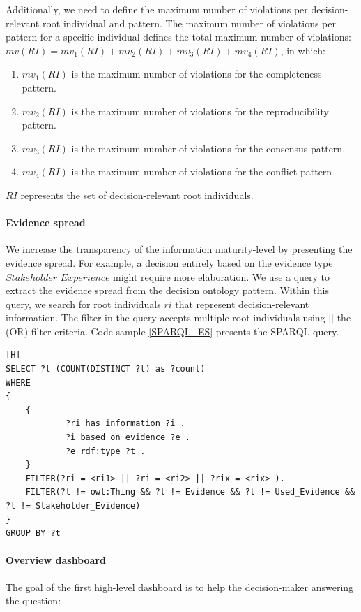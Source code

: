 Additionally, we need to define the maximum number of violations per decision-relevant root individual and pattern. The maximum number of violations per pattern for a specific individual defines the total maximum number of violations: $mv(RI) = mv_1(RI) + mv_2(RI) + mv_3(RI) + mv_4(RI)$, in which:
\begin{enumerate}
\item $mv_1(RI)$ is the maximum number of violations for the completeness pattern.
\item $mv_2(RI)$ is the maximum number of violations for the reproducibility pattern.
\item $mv_3(RI)$ is the maximum number of violations for the consensus pattern.
\item $mv_4(RI)$ is the maximum number of violations for the conflict pattern
\end{enumerate}

$RI$ represents the set of decision-relevant root individuals.

\paragraph{Evidence spread}
We increase the transparency of the information maturity-level by presenting the evidence spread. For example, a decision entirely based on the evidence type $Stakeholder\_Experience$ might require more elaboration. We use a query to extract the evidence spread from the decision ontology pattern. Within this query, we search for root individuals $ri$ that represent decision-relevant information. The filter in the query accepts multiple root individuals using $||$ the (OR) filter criteria. Code sample \ref{SPARQL_ES} presents the SPARQL query. 

\begin{lstlisting}[float,language=SPARQL1,caption={The SPARQL query that retrieves the evidence spread for decision-relevant information. The SPARQL query counts the individuals that are based on a specific evidence class using type $?t$ of evidence class $?e$.},label={SPARQL_ES}][H]
SELECT ?t (COUNT(DISTINCT ?t) as ?count) 
WHERE 
{
	{
			?ri has_information ?i .
    		?i based_on_evidence ?e .
    		?e rdf:type ?t .
	}
	FILTER(?ri = <ri1> || ?ri = <ri2> || ?rix = <rix> ).
	FILTER(?t != owl:Thing && ?t != Evidence && ?t != Used_Evidence && ?t != Stakeholder_Evidence)
}
GROUP BY ?t
\end{lstlisting}

\paragraph{Overview dashboard}
The goal of the first high-level dashboard is to help the decision-maker answering the question:

